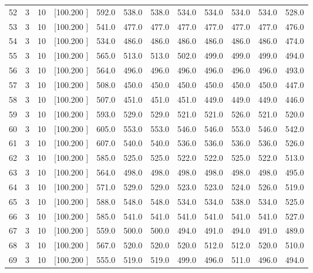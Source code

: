 \documentclass[12pt,a4paper]{article}
\begin{document}
\begin{center}
{\begin{tabular}{r r r r r r r r r r r r}
  52&  3& 10&[100.200   ]&   592.0&   538.0&   538.0&   534.0&   534.0&   534.0&   534.0&   528.0\\[-0.02in]
  53&  3& 10&[100.200   ]&   541.0&   477.0&   477.0&   477.0&   477.0&   477.0&   477.0&   476.0\\[-0.02in]
  54&  3& 10&[100.200   ]&   534.0&   486.0&   486.0&   486.0&   486.0&   486.0&   486.0&   474.0\\[-0.02in]
  55&  3& 10&[100.200   ]&   565.0&   513.0&   513.0&   502.0&   499.0&   499.0&   499.0&   494.0\\[-0.02in]
  56&  3& 10&[100.200   ]&   564.0&   496.0&   496.0&   496.0&   496.0&   496.0&   496.0&   493.0\\[-0.02in]
  57&  3& 10&[100.200   ]&   508.0&   450.0&   450.0&   450.0&   450.0&   450.0&   450.0&   447.0\\[-0.02in]
  58&  3& 10&[100.200   ]&   507.0&   451.0&   451.0&   451.0&   449.0&   449.0&   449.0&   446.0\\[-0.02in]
  59&  3& 10&[100.200   ]&   593.0&   529.0&   529.0&   521.0&   521.0&   526.0&   521.0&   520.0\\[-0.02in]
  60&  3& 10&[100.200   ]&   605.0&   553.0&   553.0&   546.0&   546.0&   553.0&   546.0&   542.0\\[-0.02in]
  61&  3& 10&[100.200   ]&   607.0&   540.0&   540.0&   536.0&   536.0&   536.0&   536.0&   526.0\\[-0.02in]
  62&  3& 10&[100.200   ]&   585.0&   525.0&   525.0&   522.0&   522.0&   525.0&   522.0&   513.0\\[-0.02in]
  63&  3& 10&[100.200   ]&   564.0&   498.0&   498.0&   498.0&   498.0&   498.0&   498.0&   495.0\\[-0.02in]
  64&  3& 10&[100.200   ]&   571.0&   529.0&   529.0&   523.0&   523.0&   524.0&   526.0&   519.0\\[-0.02in]
  65&  3& 10&[100.200   ]&   588.0&   548.0&   548.0&   534.0&   534.0&   538.0&   534.0&   525.0\\[-0.02in]
  66&  3& 10&[100.200   ]&   585.0&   541.0&   541.0&   541.0&   541.0&   541.0&   541.0&   527.0\\[-0.02in]
  67&  3& 10&[100.200   ]&   559.0&   500.0&   500.0&   494.0&   491.0&   494.0&   491.0&   489.0\\[-0.02in]
  68&  3& 10&[100.200   ]&   567.0&   520.0&   520.0&   520.0&   512.0&   512.0&   520.0&   510.0\\[-0.02in]
  69&  3& 10&[100.200   ]&   555.0&   519.0&   519.0&   499.0&   496.0&   511.0&   496.0&   494.0\\[-0.02in]

\end{tabular}}
\end{center}
\end{document}
